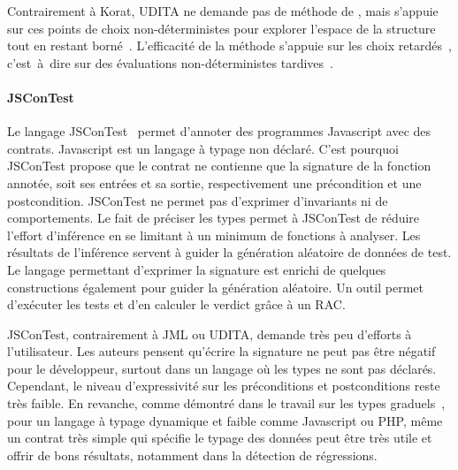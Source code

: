 Contrairement à Korat, UDITA ne demande pas de méthode de
, mais s'appuie sur ces points de choix
non-déterministes pour explorer l'espace de la structure tout en restant
borné~. L'efficacité de la méthode s'appuie
sur les choix retardés~, c'est~à~dire sur des évaluations
non-déterministes tardives~.

\paragraph{JSConTest} Le langage JSConTest~ permet d'annoter
des programmes Javascript avec des contrats. Javascript est un langage à typage
non déclaré. C'est pourquoi JSConTest propose que le contrat ne contienne que
la signature de la fonction annotée, soit ses entrées et sa sortie,
respectivement une précondition et une postcondition. JSConTest ne permet pas
d'exprimer d'invariants ni de comportements. Le fait de préciser les types
permet à JSConTest de réduire l'effort d'inférence en se limitant à un minimum
de fonctions à analyser. Les résultats de l'inférence servent à guider la
génération aléatoire de données de test. Le langage permettant d'exprimer la
signature est enrichi de quelques constructions également pour guider la
génération aléatoire. Un outil permet d'exécuter les tests et d'en calculer le
verdict grâce à un RAC.

JSConTest, contrairement à JML ou UDITA, demande très peu d'efforts à
l'utilisateur. Les auteurs pensent qu'écrire la signature ne peut pas être
négatif pour le développeur, surtout dans un langage où les types ne sont pas
déclarés. Cependant, le niveau d'expressivité sur les préconditions et
postconditions reste très faible. En revanche, comme démontré dans le travail
sur les types graduels~, pour un langage à typage dynamique et
faible comme Javascript ou PHP, même un contrat très simple qui spécifie le
typage des données peut être très utile et offrir de bons résultats, notamment
dans la détection de régressions. \\

